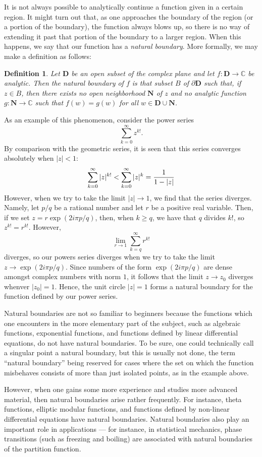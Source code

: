 \documentclass[12pt]{article}
\newtheorem{dfn}{Definition}
\begin{document}
It is not always possible to analytically continue a
function given in a certain region.  It might turn
out that, as one approaches the boundary of the region
(or a portion of the boundary), the function always blows 
up, so there is no way of extending it past that portion
of the boundary to a larger region.  When this happens,
we say that our function has a \emph{natural boundary}.  
More formally, we may make a definition as follows:

\begin{dfn}
Let $\mathbf{D}$ be an open subset of the complex plane
and let $f \colon \mathbf{D} \to \mathbb{C}$ be analytic.
Then the \emph{natural boundary} of $f$ is that subset
$B$ of $\partial \mathbf{D}$ such that, if $z\in B$,
then there exists no open neighborhood $\mathbf{N}$ of 
$z$ and no analytic function $g \colon \mathbf{N} \to
\mathbb{C}$ such that $f(w) = g(w)$ for all $w \in \mathbf{D}
\cup \mathbf{N}$.
\end{dfn}

As an example of this phenomenon, consider the power series
\[
\sum_{k=0}^\infty z^{k!}.
\]
By comparison with the geometric series, it is seen that this
series converges absolutely when $|z| < 1$:
\[
\sum_{k=0}^\infty |z|^{k!} <
\sum_{k=0}^\infty |z|^k =
{1 \over 1 - |z|}
\]
However, when we try to take the limit $|z| \to 1$, we find
that the series diverges.  Namely, let $p/q$ be a rational 
number and let $r$ be a positive real variable.  Then, if we 
set $z = r \exp (2 i \pi p / q)$, then, when $k \ge q$, we 
have that $q$ divides $k!$, so $z^{k!} = r^{k!}$.  However,
\[
\lim_{r \to 1} \sum_{k=q}^\infty r^{k!}
\]
diverges, so our powers series diverges when we try to take
the limit $z \to \exp (2 i \pi p / q)$.  Since numbers of the
form $\exp (2 i \pi p / q)$ are dense amongst complex numbers
with norm $1$, it follows that the limit $z \to z_0$ diverges
whenver $|z_0| = 1$.  Hence, the unit circle $|z| = 1$ forms
a natural boundary for the function defined by our power series.

Natural boundaries are not so familiar to beginners because
the functions which one encounters in the more elementary
part of the subject, such as algebraic functions, exponential
functions, and functions defined by linear differential
equations, do not have natural boundaries.  To be sure, one
could technically call a singular point a natural boundary, 
but this is usually not done, the term ``natural boundary''
being reserved for cases where the set on which the
function misbehaves consists of more than just isolated points,
as in the example above.

However, when one gains some more experience and studies more
advanced material, then natural boundaries arise rather
frequently.  For instance, theta functions, elliptic modular 
functions, and functions defined by non-linear differential 
equations have natural boundaries.  Natural boundaries also
play an important role in applications --- for instance, in
statistical mechanics, phase transitions (such as freezing
and boiling) are associated with natural boundaries of the
partition function.
\end{document}
